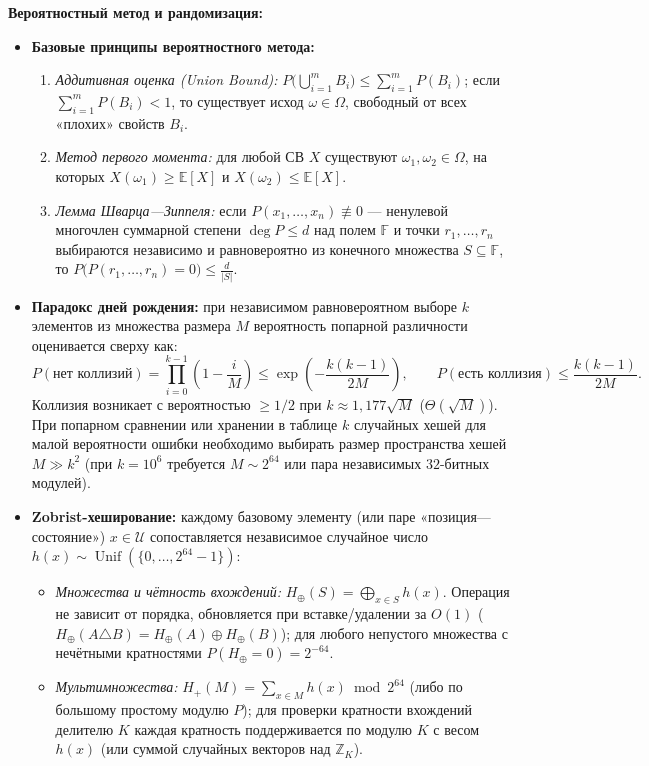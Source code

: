 \documentclass[10pt,a4paper]{article}
\renewcommand{\le}{\leqslant}
\renewcommand{\ge}{\geqslant}
\newcommand{\Z}{\mathbb{Z}}
\newcommand{\F}{\mathbb{F}}
\newcommand{\E}{\mathbb{E}}
\DeclareMathOperator{\Unif}{Unif}
\begin{document}
\textbf{Вероятностный метод и рандомизация:}
\begin{itemize}
  \item \textbf{Базовые принципы вероятностного метода:}
  \begin{enumerate}
    \item \emph{Аддитивная оценка (Union Bound):} $P\bigl(\bigcup_{i=1}^m B_i\bigr) \le \sum_{i=1}^m P(B_i)$; если $\sum_{i=1}^m P(B_i) < 1$, то существует исход $\omega \in \Omega$, свободный от всех «плохих» свойств $B_i$.
    \item \emph{Метод первого момента:} для любой СВ $X$ существуют $\omega_1, \omega_2 \in \Omega$, на которых $X(\omega_1) \ge \E[X]$ и $X(\omega_2) \le \E[X]$.
    \item \emph{Лемма Шварца—Зиппеля:} если $P(x_1, \dots, x_n) \not\equiv 0$ — ненулевой многочлен суммарной степени $\deg P \le d$ над полем $\F$ и точки $r_1, \dots, r_n$ выбираются независимо и равновероятно из конечного множества $S \subseteq \F$, то $P\bigl(P(r_1, \dots, r_n) = 0\bigr) \le \frac{d}{|S|}$.
  \end{enumerate}

  \item \textbf{Парадокс дней рождения:} при независимом равновероятном выборе $k$ элементов из множества размера $M$ вероятность попарной различности оценивается сверху как:
  \[
    P(\text{нет коллизий}) = \prod_{i=0}^{k - 1}\left(1 - \frac{i}{M}\right) \le \exp\!\left(-\frac{k(k - 1)}{2M}\right), \qquad
    P(\text{есть коллизия}) \le \frac{k(k - 1)}{2M}.
  \]
  Коллизия возникает с вероятностью $\ge 1/2$ при $k \approx 1{,}177\sqrt{M}$ ($\Theta(\sqrt{M})$). При попарном сравнении или хранении в таблице $k$ случайных хешей для малой вероятности ошибки необходимо выбирать размер пространства хешей $M \gg k^2$ (при $k = 10^6$ требуется $M \sim 2^{64}$ или пара независимых $32$-битных модулей).

  \item \textbf{Zobrist-хеширование:} каждому базовому элементу (или паре «позиция—состояние») $x \in \mathcal{U}$ сопоставляется независимое случайное число $h(x) \sim \Unif(\{0, \dots, 2^{64} - 1\})$:
  \begin{itemize}
    \item \emph{Множества и чётность вхождений:} $H_\oplus(S) = \bigoplus_{x \in S} h(x)$. Операция не зависит от порядка, обновляется при вставке/удалении за $O(1)$ ($H_\oplus(A \triangle B) = H_\oplus(A) \oplus H_\oplus(B)$); для любого непустого множества с нечётными кратностями $P(H_\oplus = 0) = 2^{-64}$.
    \item \emph{Мультимножества:} $H_+(M) = \sum_{x \in M} h(x) \bmod 2^{64}$ (либо по большому простому модулю $P$); для проверки кратности вхождений делителю $K$ каждая кратность поддерживается по модулю $K$ с весом $h(x)$ (или суммой случайных векторов над $\Z_K$).
  \end{itemize}


\end{itemize}
\end{document}
